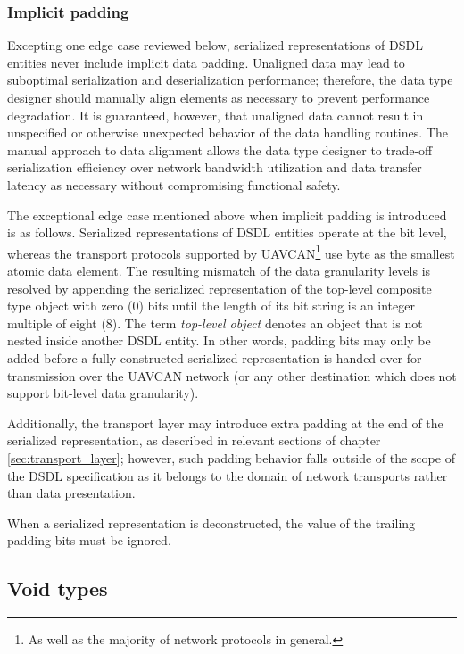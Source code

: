 \subsubsection{Implicit padding}

Excepting one edge case reviewed below,
serialized representations of DSDL entities never include implicit data padding.
Unaligned data may lead to suboptimal serialization and deserialization performance;
therefore, the data type designer should manually align elements as necessary to prevent performance degradation.
It is guaranteed, however, that unaligned data cannot result in unspecified or otherwise unexpected behavior
of the data handling routines.
The manual approach to data alignment allows the data type designer to trade-off serialization efficiency
over network bandwidth utilization and data transfer latency as necessary without compromising functional safety.

The exceptional edge case mentioned above when implicit padding is introduced is as follows.
Serialized representations of DSDL entities operate at the bit level,
whereas the transport protocols supported by UAVCAN\footnote{As well as the majority of network protocols in general.}
use byte as the smallest atomic data element.
The resulting mismatch of the data granularity levels is resolved by
appending the serialized representation of the top-level composite type object with zero (0) bits
until the length of its bit string is an integer multiple of eight (8).
The term \emph{top-level object} denotes an object that is not nested inside another DSDL entity.
In other words, padding bits may only be added before a fully constructed serialized representation is
handed over for transmission over the UAVCAN network
(or any other destination which does not support bit-level data granularity).

Additionally, the transport layer may introduce extra padding at the end of the serialized representation,
as described in relevant sections of chapter \ref{sec:transport_layer};
however, such padding behavior falls outside of the scope of the DSDL specification
as it belongs to the domain of network transports rather than data presentation.

When a serialized representation is deconstructed, the value of the trailing padding bits must be ignored.

\subsection{Void types}

